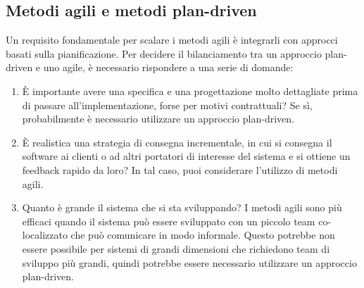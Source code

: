 \subsection{Metodi agili e metodi plan-driven}
Un requisito fondamentale per scalare i metodi agili è integrarli con approcci basati sulla pianificazione. Per decidere il bilanciamento tra un approccio plan-driven e uno agile, è necessario rispondere a una serie di domande:
\begin{enumerate}
    \item È importante avere una specifica e una progettazione molto dettagliate prima di passare all'implementazione, forse per motivi contrattuali? Se sì, probabilmente è necessario utilizzare un approccio plan-driven.
    \item È realistica una strategia di consegna incrementale, in cui si consegna il software ai clienti o ad altri portatori di interesse del sistema e si ottiene un feedback rapido da loro? In tal caso, puoi considerare l'utilizzo di metodi agili.
    \item Quanto è grande il sistema che si sta sviluppando? I metodi agili sono più efficaci quando il sistema può essere sviluppato con un piccolo team co-localizzato che può comunicare in modo informale. Questo potrebbe non essere possibile per sistemi di grandi dimensioni che richiedono team di sviluppo più grandi, quindi potrebbe essere necessario utilizzare un approccio plan-driven.
\end{enumerate}


